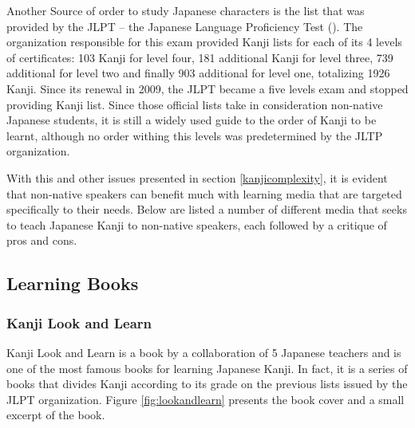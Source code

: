 Another Source of order to study Japanese characters is the list that was provided by the JLPT – the Japanese Language Proficiency Test (). The organization responsible for this exam provided Kanji lists for each of its 4 levels of certificates: 103 Kanji for level four, 181 additional Kanji for level three, 739 additional for level two and finally 903 additional for level one, totalizing 1926 Kanji. Since its renewal in 2009, the JLPT became a five levels exam and stopped providing Kanji list. Since those official lists take in consideration non-native Japanese students, it is still a widely used guide to the order of Kanji to be learnt, although no order withing this levels was predetermined by the JLTP organization.

With this and other issues presented in section \ref{kanjicomplexity}, it is evident that non-native speakers can benefit much with learning media that are targeted specifically to their needs. Below are listed a number of different media that seeks to teach Japanese Kanji to non-native speakers, each followed by a critique of pros and cons.

\subsection{Learning Books}

\subsubsection{Kanji Look and Learn}

Kanji Look and Learn\cite{kanjilookandlearn} is a book by a collaboration of 5 Japanese teachers and is one of the most famous books for learning Japanese Kanji. In fact, it is a series of books that divides Kanji according to its grade on the previous lists issued by the JLPT organization. Figure \ref{fig:lookandlearn} presents the book cover and a small excerpt of the book.


